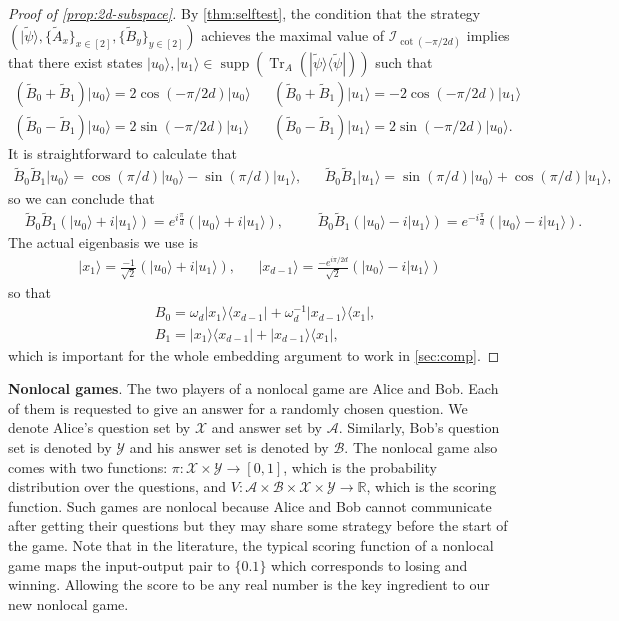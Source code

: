 \documentclass[11pt,letterpaper]{article}
\newcommand{\ket}[1]{|#1\rangle}
\newcommand{\ketbra}[2]{|#1\rangle\langle#2|}
\DeclareMathOperator{\Tr}{Tr}
\DeclareMathOperator{\supp}{supp}
\newcommand{\R}{\mathbb{R}}
\newcommand{\calX}{\mathcal{X}}
\newcommand{\calY}{\mathcal{Y}}
\newcommand{\calA}{\mathcal{A}}
\newcommand{\calB}{\mathcal{B}}
\newcommand{\1}{\mathbb{1}}
\newcommand{\tpsi}{\tilde{\psi}}
\newcommand{\I}{\mathcal{I}}
\theoremstyle{definition}
\begin{document}
\begin{proof}[Proof of \cref{prop:2d-subspace}]
	By \cref{thm:selftest}, the condition that the strategy $(\ket{\tpsi}, \{\tilde{A}_x\}_{x \in [2]}, \{\tilde{B}_y\}_{y \in [2]})$ achieves the  
	maximal value of $\I_{\cot(-\pi/2d)} $ implies that there exist states $\ket{u_0}, \ket{u_1} \in \supp(\Tr_A(\ketbra{\tpsi}{\tpsi}))$ such that 
	\begin{align*}
	(\tilde{B}_0 + \tilde{B}_1) \ket{u_0} = 2\cos(-\pi/2d) \ket{u_0} 
	&&(\tilde{B}_0 + \tilde{B}_1) \ket{u_1} = -2\cos(-\pi/2d) \ket{u_1}\\
	(\tilde{B}_0 - \tilde{B}_1) \ket{u_0} = 2\sin(-\pi/2d) \ket{u_1} 
	&&(\tilde{B}_0 - \tilde{B}_1) \ket{u_1} = 2\sin(-\pi/2d) \ket{u_0}.
	\end{align*}
	It is straightforward to calculate that 
	\begin{align*}
		\tilde{B}_0\tilde{B}_1 \ket{u_0} = \cos(\pi/d) \ket{u_0} -\sin(\pi/d) \ket{u_1},&&
		\tilde{B}_0\tilde{B}_1\ket{u_1} = \sin(\pi/d)\ket{u_0} + \cos(\pi/d) \ket{u_1},
	\end{align*}
	so we can conclude that 
	\begin{align*}
		&\tilde{B}_0\tilde{B}_1(\ket{u_0} + i\ket{u_1}) = e^{i \frac{\pi}{d}} (\ket{u_0} + i\ket{u_1}), &&
		&\tilde{B}_0\tilde{B}_1(\ket{u_0} - i\ket{u_1}) = e^{-i \frac{\pi}{d}} (\ket{u_0} - i\ket{u_1}).
	\end{align*}
	The actual eigenbasis we use is 
	\begin{align}
		\ket{x_1} = \frac{-1}{\sqrt{2}}(\ket{u_0} + i\ket{u_1}), &&
		\ket{x_{d-1}} = \frac{-e^{i\pi/2d}}{\sqrt{2}}(\ket{u_0} - i\ket{u_1})
	\end{align}
	so that 
	\begin{align}
		&B_0 = \omega_d\ketbra{x_1}{x_{d-1}} + \omega_d^{-1} \ketbra{x_{d-1}}{x_1},\\
		&B_1 =\ketbra{x_1}{x_{d-1}}  + \ketbra{x_{d-1}}{x_1},
	\end{align}
	which is important for the whole embedding argument to work in \cref{sec:comp}.
\end{proof}

\textbf{Nonlocal games}. The two players of a nonlocal game are Alice and Bob. Each of them is requested
to give an answer for a randomly chosen question. We denote Alice's question set by $\calX$ and answer set by $\calA$. Similarly,
Bob's question set is denoted by $\calY$ and his answer set is denoted by $\calB$. The nonlocal game also
comes with two functions: $\pi: \calX \times \calY \rightarrow [0,1]$, which is the probability distribution over the questions,
and $V: \calA \times \calB \times \calX \times \calY \rightarrow \R$, which is the scoring function. Such games are nonlocal
because Alice and Bob cannot communicate after getting their questions but they may share some strategy before 
the start of the game. Note that in the literature, the typical scoring function of a nonlocal game maps the input-output
pair to $\{0.1\}$ which corresponds to losing and winning. Allowing the score to be any real number is the key ingredient 
to our new nonlocal game. 
\end{document}
